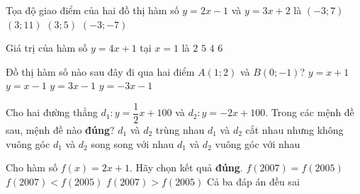 \begin{ex}%
	Tọa độ giao điểm của hai đồ thị hàm số $y=2x-1$ và $y=3x+2$ là
	\choice
	{$(-3;7)$}
	{$(3;11)$}
	{$(3;5)$}
	{\True $(-3;-7)$}
\end{ex}

\begin{ex}%
	Giá trị của hàm số $y=4x+1$ tại $x=1$ là
	\choice
	{$2$}
	{\True $5$}
	{$4$}
	{$6$}
\end{ex}

\begin{ex}%
	Đồ thị hàm số nào sau đây đi qua hai điểm $A(1;2)$ và $B(0;-1)$?
	\choice
	{$y=x+1$}
	{$y=x-1$}
	{\True $y=3x-1$}
	{$y=-3x-1$}
\end{ex}

\begin{ex}%
	Cho hai đường thẳng $d_{1}:y=\dfrac{1}{2}x+100$ và $d_{2}:y=-2x+100$. Trong các mệnh đề sau, mệnh đề nào \textbf{đúng}?
	\choice
	{$d_{1}$ và $d_{2}$ trùng nhau}
	{$d_{1}$ và $d_{2}$ cắt nhau nhưng không vuông góc}
	{$d_{1}$ và $d_{2}$ song song với nhau}
	{\True $d_{1}$ và $d_{2}$ vuông góc với nhau}
\end{ex}

\begin{ex}%
	Cho hàm số $f(x)=2x+1$. Hãy chọn kết quả \textbf{đúng}.
	\choice
	{$f(2007)=f(2005)$}
	{$f(2007)<f(2005)$}
	{\True $f(2007)>f(2005)$}
	{Cả ba đáp án đều sai}
\end{ex}

